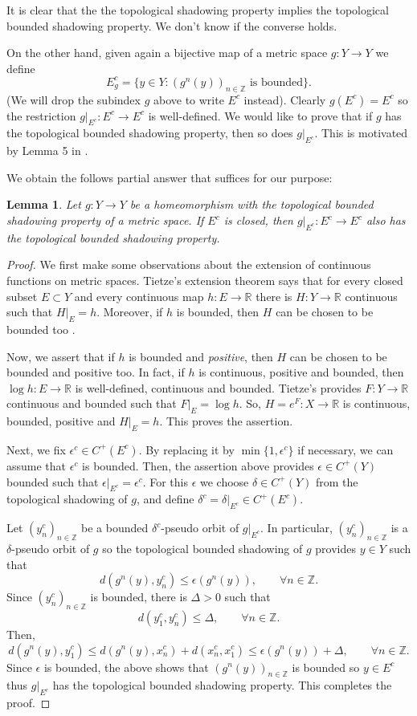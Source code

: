 \documentclass[11pt,letterpaper]{amsart}
\newtheorem{lem}{Lemma}
\numberwithin{equation}{section}
\begin{document}
It is clear that the the topological shadowing property implies the topological bounded shadowing property. We don't know if the converse holds.

On the other hand, given again a bijective map of a metric space $g:Y\to Y$ we define
$$
E^c_g=\{y\in Y:(g^n(y))_{n\in\mathbb{Z}}\mbox{ is bounded}\}.
$$
(We will drop the subindex $g$ above to write $E^c$ instead).
Clearly $g(E^c)=E^c$ so the restriction $g|_{E^c}:E^c\to E^c$ is well-defined.
We would like to prove that if $g$ has the topological bounded shadowing property, then so does $g|_{E^c}$. This is motivated by Lemma 5 in \cite{lm}.

We obtain the follows partial answer that suffices for our purpose:

\begin{lem}
\label{viva}
Let $g:Y\to Y$ be a homeomorphism with the topological bounded shadowing property of a metric space.
If $E^c$ is closed, then $g|_{E^c}:E^c\to E^c$ also has the topological bounded shadowing property.
\end{lem}

\begin{proof}
We first make some observations about the extension of continuous functions on metric spaces.
Tietze's extension theorem says that for every closed subset $E\subset Y$ and every continuous map $h:E\to \mathbb{R}$ there is $H:Y\to \mathbb{R}$ continuous such that $H|_E=h$. Moreover, if $h$ is bounded, then $H$ can be chosen to be bounded too \cite{ke}.

Now, we assert that if $h$ is bounded and {\em positive}, then $H$ can be chosen to be bounded and positive too.
In fact, if $h$ is continuous, positive and bounded, then $\log h:E\to \mathbb{R}$ is well-defined, continuous and bounded.
Tietze's provides $F:Y\to\mathbb{R}$ continuous and bounded such that
$F|_E=\log h$. So, $H=e^F:X\to \mathbb{R}$ is continuous, bounded, positive
and $H|_E=h$. This proves the assertion.



Next, we fix $\epsilon^c\in C^+(E^c)$. By replacing it by $\min\{1,\epsilon^c\}$ if necessary, we can assume that $\epsilon^c$ is bounded. Then, the assertion above provides
$\epsilon\in C^+(Y)$ bounded such that $\epsilon|_{E^c}=\epsilon^c$. For this $\epsilon$ we choose
$\delta\in C^+(Y)$ from the topological shadowing of $g$, and define
$\delta^c=\delta|_{E^c}\in C^+(E^c)$.

Let $(y_n^c)_{n\in\mathbb{Z}}$ be a bounded $\delta^c$-pseudo orbit of $g|_{E^c}$. In particular, $(y^c_n)_{n\in\mathbb{Z}}$ is a $\delta$-pseudo orbit of $g$ so the topological bounded shadowing of $g$ provides
$y\in Y$ such that
$$
d(g^n(y),y^c_n)\leq \epsilon(g^n(y)),\quad\quad\forall n\in\mathbb{Z}.
$$
Since $(y^c_n)_{n\in\mathbb{Z}}$ is bounded, there is $\Delta>0$ such that
$$
d(y_1^c,y^c_n)\leq \Delta,\quad\quad\forall n\in\mathbb{Z}.
$$
Then,
$$
d(g^n(y),y^c_1)\leq d(g^n(y),x^c_n)+d(x^c_n,x^c_1)\leq \epsilon(g^n(y))+\Delta,\quad\quad\forall n\in\mathbb{Z}.
$$
Since $\epsilon$ is bounded, the above shows that $(g^n(y))_{n\in\mathbb{Z}}$ is bounded so $y\in E^c$ thus $g|_{E^c}$ has the topological bounded shadowing property.
This completes the proof.
\end{proof}
\end{document}
